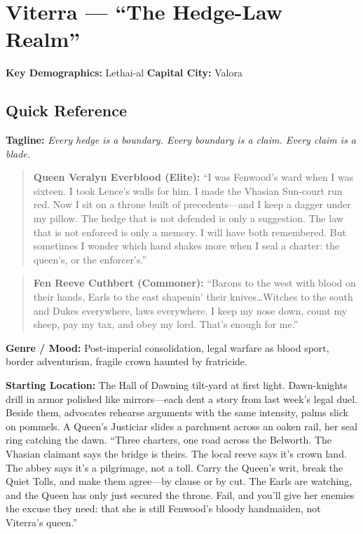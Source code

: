 \section{Viterra --- ``The Hedge-Law Realm''}
\label{chap:viterra}

\textbf{Key Demographics: } Lethai-al
\textbf{Capital City: } Valora

\subsection*{Quick Reference}

\textbf{Tagline:} \textit{Every hedge is a boundary. Every boundary is a claim. Every claim is a blade.}

\begin{quote}
  \textbf{Queen Veralyn Everblood (Elite):}  
  ``I was Fenwood's ward when I was sixteen. I took Lence's walls for him. I made the Vhasian Sun-court run red. Now I sit on a throne built of precedents---and I keep a dagger under my pillow. The hedge that is not defended is only a suggestion. The law that is not enforced is only a memory. I will have both remembered. But sometimes I wonder which hand shakes more when I seal a charter: the queen's, or the enforcer's.''
\end{quote}

\begin{quote}
  \textbf{Fen Reeve Cuthbert (Commoner):}  
  ``Barons to the west with blood on their hands, Earls to the east shapenin' their knives\dots Witches to the south and Dukes everywhere, laws everywhere. I keep my nose down, count my sheep, pay my tax, and obey my lord. That's enough for me.''
\end{quote}

\noindent\textbf{Genre / Mood:} Post-imperial consolidation, legal warfare as blood sport, border adventurism, fragile crown haunted by fratricide.

\noindent\textbf{Starting Location:} The Hall of Dawning tilt-yard at first light. Dawn-knights drill in armor polished like mirrors---each dent a story from last week's legal duel. Beside them, advocates rehearse arguments with the same intensity, palms slick on pommels. A Queen's Justiciar slides a parchment across an oaken rail, her seal ring catching the dawn. ``Three charters, one road across the Belworth. The Vhasian claimant says the bridge is theirs. The local reeve says it's crown land. The abbey says it's a pilgrimage, not a toll. Carry the Queen's writ, break the Quiet Tolls, and make them agree---by clause or by cut. The Earls are watching, and the Queen has only just secured the throne. Fail, and you'll give her enemies the excuse they need: that she is still Fenwood's bloody handmaiden, not Viterra's queen.''

